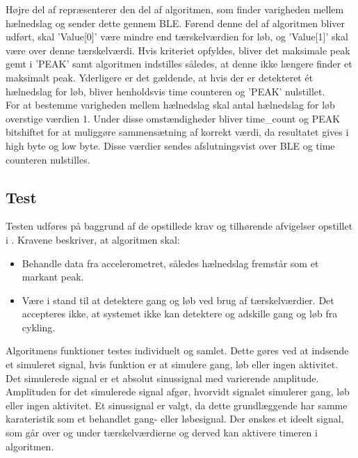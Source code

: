 Højre del af  repræsenterer den del af algoritmen, som finder varigheden mellem hælnedslag og sender dette gennem BLE. Førend denne del af algoritmen bliver udført, skal 'Value[0]' være mindre end tærskelværdien for løb, og 'Value[1]' skal være over denne tærskelværdi. Hvis kriteriet opfyldes, bliver det maksimale peak gemt i 'PEAK' samt algoritmen indstilles således, at denne ikke længere finder et maksimalt peak. Yderligere er det gældende, at hvis der er detekteret ét hælnedslag for løb, bliver henholdsvis time counteren og 'PEAK' nulstillet. \\
For at bestemme varigheden mellem hælnedslag  skal antal hælnedslag for løb overstige værdien 1. Under disse omstændigheder bliver time\_count og PEAK bitshiftet for at muliggøre sammensætning af korrekt værdi, da resultatet gives i high byte og low byte. Disse værdier sendes afslutningsvist over BLE og time counteren nulstilles.

\subsection{Test}
Testen udføres på baggrund af de opstillede krav og tilhørende afvigelser opstillet i . Kravene beskriver, at algoritmen skal:
\begin{itemize}
	\item Behandle data fra accelerometret, således hælnedslag fremstår som et markant peak.
	\item Være i stand til at detektere gang og løb ved brug af tærskelværdier. Det accepteres ikke, at systemet ikke kan detektere og adskille gang og løb fra cykling.
\end{itemize}
Algoritmens funktioner testes individuelt og samlet. Dette gøres ved at indsende et simuleret signal, hvis funktion er at simulere gang, løb eller ingen aktivitet. Det simulerede signal er et absolut sinussignal med varierende amplitude. Amplituden for det simulerede signal afgør, hvorvidt signalet simulerer gang, løb eller ingen aktivitet. Et sinussignal er valgt, da dette grundlæggende har samme karateristik som et behandlet gang- eller løbesignal. Der ønskes et ideelt signal, som går over og under tærskelværdierne og derved kan aktivere timeren i algoritmen.

